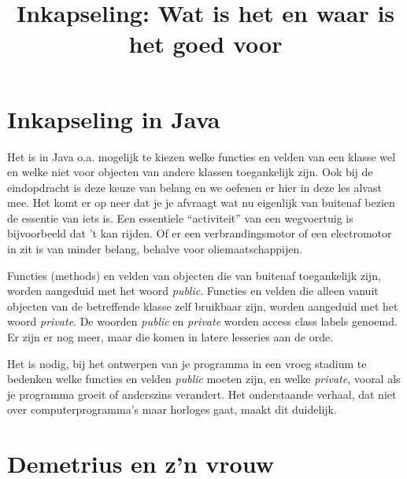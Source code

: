 \documentclass[a4paper,11pt]{article}
\begin{document}
\title{Inkapseling: Wat is het en waar is het goed voor}
\date{}

\maketitle

\section{Inkapseling in Java}

Het is in Java o.a. mogelijk te kiezen welke functies en velden van een klasse wel en welke niet voor objecten van andere klassen toegankelijk zijn.
Ook bij de eindopdracht is deze keuze van belang en we oefenen er hier in deze les alvast mee.
Het komt er op neer dat je je afvraagt wat nu eigenlijk van buitenaf bezien de essentie van iets is.
Een essentiele ``activiteit'' van een wegvoertuig is bijvoorbeeld dat 't kan rijden.
Of er een verbrandingsmotor of een electromotor in zit is van minder belang, behalve voor oliemaatschappijen.

Functies (methods) en velden van objecten die van buitenaf toegankelijk zijn, worden aangeduid met het woord \emph{public}.
Functies en velden die alleen vanuit objecten van de betreffende klasse zelf bruikbaar zijn, worden aangeduid met het woord \emph{private}.
De woorden \emph{public} en \emph{private} worden access class labels genoemd.
Er zijn er nog meer, maar die komen in latere lesseries aan de orde.

Het is nodig, bij het ontwerpen van je programma in een vroeg stadium te bedenken welke functies en velden \emph{public} moeten zijn, en welke \emph{private},
vooral als je programma groeit of anderszins verandert.
Het onderstaande verhaal, dat niet over computerprogramma's maar horloges gaat, maakt dit duidelijk.

\section{Demetrius en z'n vrouw}
\end{document}
